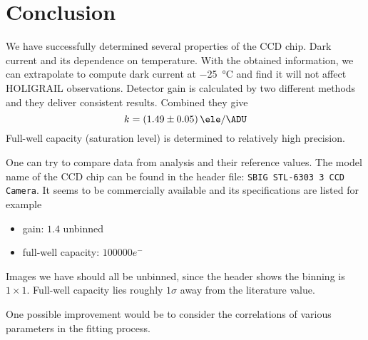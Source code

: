 \section{Conclusion}
We have successfully determined several properties of the CCD chip. Dark current and its dependence on temperature. With the obtained information, we can extrapolate to compute dark current at \SI{-25}{\degreeCelsius} and find it will not affect HOLIGRAIL observations. Detector gain is calculated by two different methods and they deliver consistent results. Combined they give
\begin{equation*}
	k = \SI{1.49 +- 0.05}{\ele\per\ADU}
\end{equation*}
Full-well capacity (saturation level) is determined to relatively high precision.

One can try to compare data from analysis and their reference values. The model name of the CCD chip can be found in the header file: \verb|SBIG STL-6303 3 CCD Camera|. It seems to be commercially available and its specifications are listed for example~\cite{SBIG}
\begin{itemize}
	\item gain: $1.4$ unbinned
	\item full-well capacity: $\num{100 000} e^-$
\end{itemize}
Images we have should all be unbinned, since the header shows the binning is $1\times 1$. Full-well capacity lies roughly $1\sigma$ away from the literature value.

One possible improvement would be to consider the correlations of various parameters in the fitting process.
